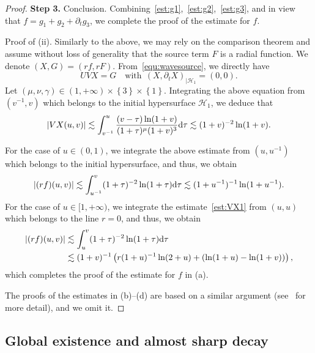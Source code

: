 \documentclass[a4paper,reqno]{amsart}
\theoremstyle{definition}
\numberwithin{equation}{section}
\def \d {{\rm{d}}}
\begin{document}
\begin{proof}
\textbf{Step 3.} Conclusion.
Combining~\eqref{est:g1},~\eqref{est:g2},~\eqref{est:g3}, and in view that $f=g_{1}+g_{2}+\partial_{t}g_{3}$, we complete the proof of the estimate for $f$.

\smallskip
Proof of (ii). Similarly to the above, we may rely on the comparison theorem and assume without loss of generality that the source term $F$ is a radial function. We denote $(X,G)=(rf,rF)$. From~\eqref{equ:wavesource}, we directly have 
\begin{equation*}
    UVX=G\quad \mbox{with}\ \ (X,\partial_{t}X)_{|\mathcal{H}_{1}}=(0,0).
\end{equation*}
 Let $(\mu,\nu,\gamma)\in (1,+\infty)\times \left\{3\right\}\times \left\{1\right\}$. Integrating the above equation from $(v^{-1},v)$ which belongs to the initial hypersurface $\mathcal{H}_{1}$, we deduce that 
 \begin{equation}\label{est:VX1}
     \left|VX(u,v)\right|\lesssim \int_{v^{-1}}^{u}
     \frac{(v-\tau)\ln(1+v)}{(1+\tau)^{\mu}(1+v)^{3}}\d \tau \lesssim (1+v)^{-2}\ln (1+v).
 \end{equation}

 For the case of $u\in (0,1)$,
we integrate the above estimate from $(u,u^{-1})$ which belongs to the initial hypersurface, and thus, we obtain 
\begin{equation*}
    \left|(rf)(u,v)\right|\lesssim 
    \int_{u^{-1}}^{v}(1+\tau)^{-2}\ln (1+\tau)\d \tau \lesssim (1+u^{-1})^{-1}\ln(1+u^{-1}).
\end{equation*}
For the case of $u\in [1,+\infty)$, we integrate the estimate~\eqref{est:VX1} from $(u,u)$ which belongs to the line $r=0$, and thus, we obtain 
\begin{equation*}
\begin{aligned}
    \left|(rf)(u,v)\right|
    &\lesssim 
    \int_{u}^{v}(1+\tau)^{-2}\ln (1+\tau)\d \tau \\
    &\lesssim 
    (1+v)^{-1}
    \left(r(1+u)^{-1}\ln (2+u)+(\ln(1+u)-\ln(1+v))\right),
    \end{aligned}
\end{equation*}
which completes the proof of the estimate for $f$ in (a).

The proofs of the estimates in (b)--(d) are based on a similar argument (see~\cite[Proposition 3.1]{AlinhacIndiana} for more detail), and we omit it.
\end{proof}

 \subsection {Global existence and almost sharp decay}
   
\end{document}
